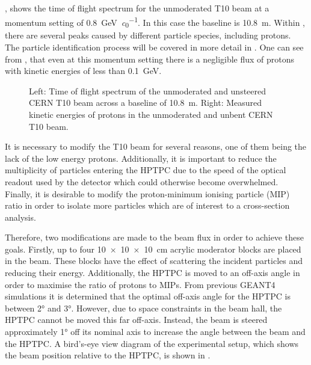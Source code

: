 , shows the time of flight spectrum for the unmoderated T10 beam at a momentum setting of \SI{0.8}{\giga\electronvolt\per\clight}.
In this case the baseline is \SI{10.8}{\metre}.
Within , there are several peaks caused by different particle species, including protons.
The particle identification process will be covered in more detail in .
One can see from , that even at this momentum setting there is a negligible flux of protons with kinetic energies of less than \SI{0.1}{\giga\electronvolt}.

\begin{figure}[h]
  \begin{minipage}[t]{.5\textwidth}
    \begin{adjustbox}{max totalsize=\textwidth, center}
      
    \end{adjustbox}
  \end{minipage}
  \begin{minipage}[t]{.5\textwidth}
    \begin{adjustbox}{max totalsize=\textwidth, center}
      
    \end{adjustbox}
  \end{minipage}
  \caption[Time of flight spectrum and proton kinetic energy for the unmoderated and unsteered T10 beam]{Left: Time of flight spectrum of the unmoderated and unsteered CERN T10 beam across a baseline of \SI{10.8}{\metre}. Right: Measured kinetic energies of protons in the unmoderated and unbent CERN T10 beam.}
  \label{fig:unmoderatedBeam}
\end{figure}

It is necessary to modify the T10 beam for several reasons, one of them being the lack of the low energy protons.
Additionally, it is important to reduce the multiplicity of particles entering the HPTPC due to the speed of the optical readout used by the detector which could otherwise become overwhelmed.
Finally, it is desirable to modify the proton-minimum ionising particle (MIP) ratio in order to isolate more particles which are of interest to a cross-section analysis.

Therefore, two modifications are made to the beam flux in order to achieve these goals.
Firstly, up to four \SI{10 x 10 x 10}{\cm} acrylic moderator blocks are placed in the beam.
These blocks have the effect of scattering the incident particles and reducing their energy.
Additionally, the HPTPC is moved to an off-axis angle in order to maximise the ratio of protons to MIPs.
From previous GEANT4~\cite{geant} simulations it is determined that the optimal off-axis angle for the HPTPC is between \ang{2} and \ang{3}.
However, due to space constraints in the beam hall, the HPTPC cannot be moved this far off-axis.
Instead, the beam is steered approximately \ang{1} off its nominal axis to increase the angle between the beam and the HPTPC.
A bird's-eye view diagram of the experimental setup, which shows the beam position relative to the HPTPC, is shown in .


